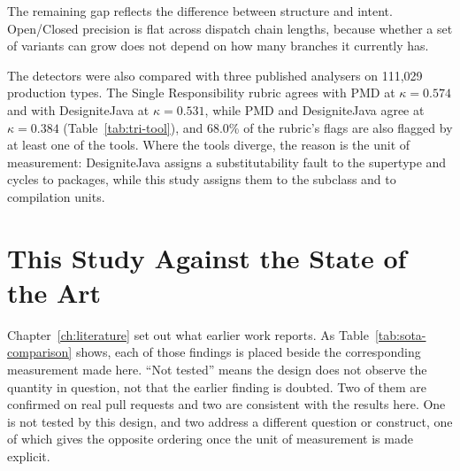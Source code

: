 The remaining gap reflects the difference between structure and intent. Open/Closed precision is flat
across dispatch chain lengths, because whether a set of variants can grow does not depend on how many
branches it currently has.

The detectors were also compared with three published analysers on 111{,}029 production types. The
Single Responsibility rubric agrees with PMD at $\kappa = 0.574$ and with DesigniteJava at
$\kappa = 0.531$, while PMD and DesigniteJava agree at $\kappa = 0.384$ (Table~\ref{tab:tri-tool}),
and 68.0\% of the rubric's flags are also flagged by at least one of the tools. Where the tools
diverge, the reason is the unit of measurement: DesigniteJava assigns a substitutability fault to the
supertype and cycles to packages, while this study assigns them to the subclass and to compilation
units.

\section{This Study Against the State of the Art}
\label{sec:against-sota}

Chapter~\ref{ch:literature} set out what earlier work reports. As Table~\ref{tab:sota-comparison}
shows, each of those findings is placed beside the corresponding measurement made here. ``Not tested''
means the design does not observe the quantity in question, not that the earlier finding is doubted. Two of them are
confirmed on real pull requests and two are consistent with the results here. One is not tested by
this design, and two address a different question or construct, one of which gives the opposite
ordering once the unit of measurement is made explicit.


